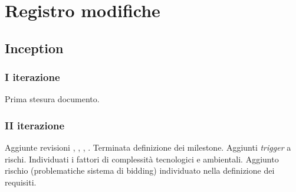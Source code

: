 \documentclass[10pt]{softeng}
\begin{document}
\startofdocument

\clearpage





\clearpage



\clearpage



\clearpage



\clearpage

\section{Registro modifiche}

\subsection{Inception}

\subsubsection{I iterazione}

Prima stesura documento.

\subsubsection{II iterazione}

Aggiunte revisioni , , , .
Terminata definizione dei milestone.
Aggiunti \emph{trigger} a rischi.
Individuati i fattori di complessit\`a tecnologici e ambientali.
Aggiunto rischio  (problematiche sistema di bidding) individuato nella definizione dei requisiti.
\end{document}
